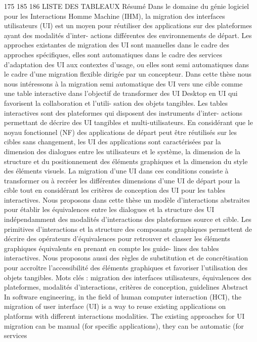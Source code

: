 \documentclass{article}
\begin{document}
175
185
186
LISTE DES TABLEAUX
Résumé
Dans le domaine du génie logiciel pour les Interactions Homme Machine (IHM), la migration des interfaces
utilisateurs (UI) est un moyen pour réutiliser des applications sur des plateformes ayant des modalités d’inter-
actions différentes des environnements de départ. Les approches existantes de migration des UI sont manuelles
dans le cadre des approches spéciﬁques, elles sont automatiques dans le cadre des services d’adaptation des UI
aux contextes d’usage, ou elles sont semi automatiques dans le cadre d’une migration ﬂexible dirigée par un
concepteur.
Dans cette thèse nous nous intéressons à la migration semi automatique des UI vers une cible comme une
table interactive dans l’objectif de transformer des UI Desktop en UI qui favorisent la collaboration et l’utili-
sation des objets tangibles. Les tables interactives sont des plateformes qui disposent des instruments d’inter-
actions permettant de décrire des UI tangibles et multi-utilisateurs. En considérant que le noyau fonctionnel
(NF) des applications de départ peut être réutilisés sur les cibles sans changement, les UI des applications sont
caractérisées par la dimension des dialogues entre les utilisateurs et le système, la dimension de la structure et
du positionnement des éléments graphiques et la dimension du style des éléments visuels. La migration d’une
UI dans ces conditions consiste à transformer ou à recréer les différentes dimensions d’une UI de départ pour
la cible tout en considérant les critères de conception des UI pour les tables interactives.
Nous proposons dans cette thèse un modèle d’interactions abstraites pour établir les équivalences entre les
dialogues et la structure des UI indépendamment des modalités d’interactions des plateformes source et cible.
Les primitives d’interactions et la structure des composants graphiques permettent de décrire des opérateurs
d’équivalences pour retrouver et classer les éléments graphiques équivalents en prenant en compte les guide-
lines des tables interactives. Nous proposons aussi des règles de substitution et de concrétisation pour accroître
l’accessibilité des éléments graphiques et favoriser l’utilisation des objets tangibles.
Mots clés :
migration des interfaces utilisateurs, équivalences des plateformes, modalités d’interactions,
critères de conception, guidelines
Abstract
In software engineering, in the ﬁeld of human computer interaction (HCI), the migration of user interface
(UI) is a way to reuse existing applications on platforms with different interactions modalities. The existing
approaches for UI migration can be manual (for speciﬁc applications), they can be automatic (for services
\end{document}
